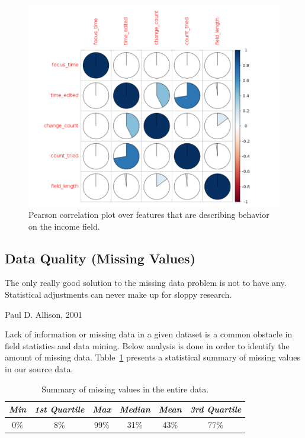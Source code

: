 \begin{figure}[h!]
    \centering
    \includegraphics[scale=0.4]{Graphics/corr-plott.png}
    \caption{Pearson correlation plot over features that are describing behavior on the income field.} %
    \label{fig:corr-plott}
\end{figure}


\subsection{Data Quality (Missing Values)}\label{Ch:2:DataQuality}
\epigraph{The only really good solution to the missing data problem is not to have any. Statistical adjustments can never make up for sloppy research. }{Paul D. Allison, 2001}


Lack of information or missing data in a given dataset is a common obstacle in field statistics and data mining. Below analysis is done in order to identify the amount of missing data. Table~\ref{tab:missings-over-all} presents a statistical summary of missing values in our source data.
 \begin{table}[ht!]
  \begin{center}
    \caption{Summary of missing values in the entire data.}
    \label{tab:missings-over-all}
    \begin{tabular}{|c|c|c|c|c|c|}\hline
    \textit{Min} & \textit{1st Quartile} & \textit{Max} & \textit{Median} & \textit{Mean} & \textit{3rd Quartile} \\
      \hline
     0\% & 8\% & 99\% & 31\% & 43\% & 77\% \\ 
     \hline 
    \end{tabular}
  \end{center}
\end{table}

